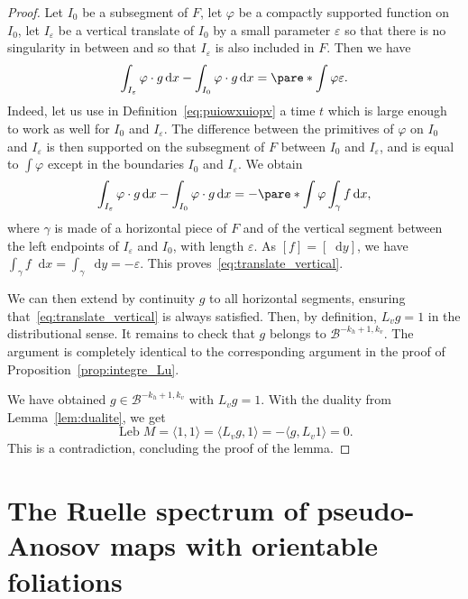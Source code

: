\documentclass[11pt, a4paper, oneside, final, pagebackref]{amsart}
\newcommand{\boB}{\mathcal{B}}
\newcommand{\dd}{\mathop{}\!\mathrm{d}}
\DeclareMathOperator{\Leb}{Leb}
\renewcommand{\epsilon}{\varepsilon}
\renewcommand{\phi}{\varphi}
\theoremstyle{definition}
\numberwithin{equation}{section}
\begin{document}
\begin{proof}
Let $I_0$ be a subsegment of $F$, let $\phi$ be a compactly supported
function on $I_0$, let $I_\epsilon$ be a vertical translate of $I_0$ by a
small parameter $\epsilon$ so that there is no singularity in between and so
that $I_\epsilon$ is also included in $F$. Then we have
\begin{equation}
\label{eq:translate_vertical}
  \int_{I_\epsilon} \phi \cdot g \dd x - \int_{I_0} \phi \cdot g \dd x = \pare*{\int \phi} \epsilon.
\end{equation}
Indeed, let us use in Definition~\eqref{eq:puiowxuiopv} a time $t$ which is
large enough to work as well for $I_0$ and $I_\epsilon$. The difference
between the primitives of $\phi$ on $I_0$ and $I_\epsilon$ is then supported
on the subsegment of $F$ between $I_0$ and $I_\epsilon$, and is equal to
$\int \phi$ except in the boundaries $I_0$ and $I_\epsilon$. We obtain
\begin{equation*}
  \int_{I_\epsilon} \phi \cdot g \dd x - \int_{I_0} \phi \cdot g \dd x = - \pare*{\int \phi} \int_\gamma f \dd x,
\end{equation*}
where $\gamma$ is made of a horizontal piece of $F$ and of the vertical
segment between the left endpoints of $I_\epsilon$ and $I_0$, with length
$\epsilon$. As $[f] = [\dd y]$, we have $\int_\gamma f \dd x = \int_\gamma
\dd y = - \epsilon$. This proves~\eqref{eq:translate_vertical}.

We can then extend by continuity $g$ to all horizontal segments, ensuring
that~\eqref{eq:translate_vertical} is always satisfied. Then, by definition,
$L_v g = 1$ in the distributional sense. It remains to check that $g$ belongs
to $\boB^{-k_h+1, k_v}$. The argument is completely identical to the
corresponding argument in the proof of Proposition~\ref{prop:integre_Lu}.

We have obtained $g \in \boB^{-k_h+1, k_v}$ with $L_v g = 1$. With the
duality from Lemma~\ref{lem:dualite}, we get
\begin{equation*}
  \Leb M = \langle 1, 1\rangle = \langle L_v g, 1 \rangle = - \langle g, L_v 1 \rangle
  = 0.
\end{equation*}
This is a contradiction, concluding the proof of the lemma.
\end{proof}




\section{The Ruelle spectrum of pseudo-Anosov maps with orientable
foliations}
\end{document}
